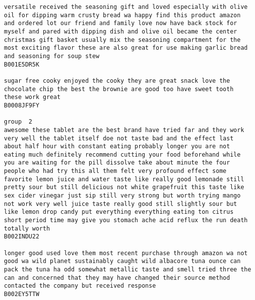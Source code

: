 \documentclass[11pt]{article}
\begin{document}
\begin{Verbatim}[commandchars=\\\{\}]
versatile received the seasoning gift and loved especially with olive oil for dipping warm crusty bread wa happy find this product amazon and ordered lot our friend and family love now have back stock for myself and pared with dipping dish and olive oil became the center christmas gift basket usually mix the seasoning compartment for the most exciting flavor these are also great for use making garlic bread and seasoning for soup stew
B001E5DR5K

sugar free cooky enjoyed the cooky they are great snack love the chocolate chip the best the brownie are good too have sweet tooth these work great
B0008JF9FY

group  2
awesome these tablet are the best brand have tried far and they work very well the tablet itself doe not taste bad and the effect last about half hour with constant eating probably longer you are not eating much definitely recommend cutting your food beforehand while you are waiting for the pill dissolve take about minute the four people who had try this all them felt very profound effect some favorite lemon juice and water taste like really good lemonade still pretty sour but still delicious not white grapefruit this taste like sex cider vinegar just sip still very strong but worth trying mango not work very well juice taste really good still slightly sour but like lemon drop candy put everything everything eating ton citrus short period time may give you stomach ache acid reflux the run death totally worth
B002INDU22

longer good used love them most recent purchase through amazon wa not good wa wild planet sustainably caught wild albacore tuna ounce can pack the tuna ha odd somewhat metallic taste and smell tried three the can and concerned that they may have changed their source method contacted the company but received response
B002EY5TTW


\end{Verbatim}
\end{document}
